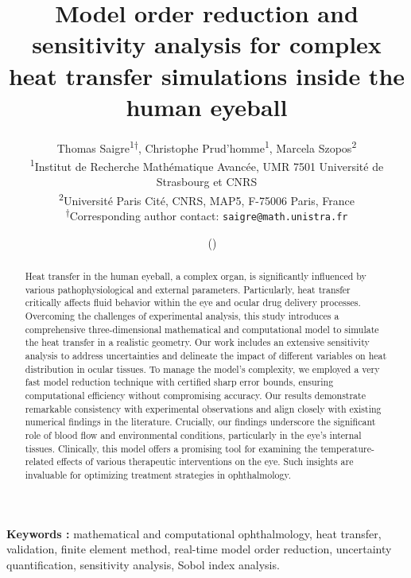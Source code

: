 \documentclass[a4paper]{article}
\title{Model order reduction and sensitivity analysis for complex heat transfer simulations inside the human eyeball}
\author{%
    \texorpdfstring{
        Thomas Saigre\textsuperscript{1}\textsuperscript{$\dagger$}, Christophe Prud'homme\textsuperscript{1}, Marcela Szopos\textsuperscript{2}\\
        \small\textsuperscript{1}Institut de Recherche Mathématique Avancée, UMR 7501 Université de Strasbourg et CNRS\\
        \small\textsuperscript{2}Université Paris Cité, CNRS, MAP5, F-75006 Paris, France\\
        \small\textsuperscript{$\dagger$}Corresponding author contact: \texttt{saigre@math.unistra.fr}
    }{Thomas Saigre, Christophe Prud'homme, Marcela Szopos}
}
\date{\gitReln\  \gitAuthorDate\ (\gitAbbrevHash)}
\begin{document}
\maketitle

\begin{abstract}
    Heat transfer in the human eyeball, a complex organ, is significantly influenced by various pathophysiological and external parameters.
    Particularly, heat transfer critically affects fluid behavior within the eye and ocular drug delivery processes.
    Overcoming the challenges of experimental analysis, this study introduces a comprehensive three-dimensional mathematical and computational model to simulate the heat transfer in a realistic geometry.
    Our work includes an extensive sensitivity analysis to address uncertainties and delineate the impact of different variables on heat distribution in ocular tissues.
    To manage the model's complexity, we employed a very fast model reduction technique with certified sharp error bounds, ensuring computational efficiency without compromising accuracy.
    Our results demonstrate remarkable consistency with experimental observations and align closely with existing numerical findings in the literature.
    Crucially, our findings underscore the significant role of blood flow and environmental conditions, particularly in the eye's internal tissues.
    Clinically, this model offers a promising tool for examining the temperature-related effects of various therapeutic interventions on the eye.
    Such insights are invaluable for optimizing treatment strategies in ophthalmology.
\end{abstract}

\tableofcontents



\vspace{\baselineskip}

\noindent
\textbf{Keywords :} mathematical and computational ophthalmology, heat transfer, validation, finite element method, real-time model order reduction, uncertainty quantification, sensitivity analysis, Sobol index analysis.










\end{document}
